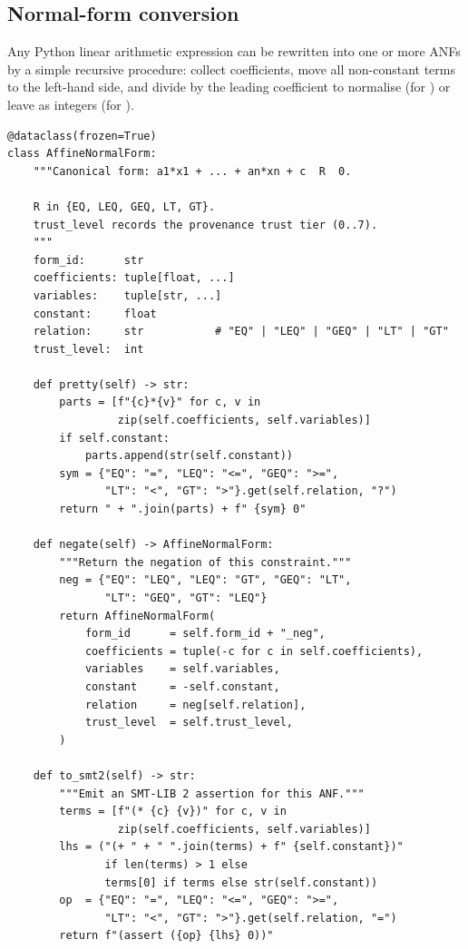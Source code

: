 \documentclass[11pt]{article}
\begin{document}
\subsection{Normal-form conversion}

Any Python linear arithmetic expression can be rewritten into
one or more ANFs by a simple recursive procedure:
collect coefficients, move all non-constant terms to the
left-hand side, and divide by the leading coefficient to
normalise (for \QFLRA{}) or leave as integers (for \QFLIA{}).

\begin{lstlisting}[style=jugeo-python,
  caption={\texttt{AffineNormalForm} dataclass from
  \texttt{tensor\_quantifier\_encodings/}\newline
  \texttt{affine\_and\_quasi\_affine\_normal\_for.py}.},
  label={lst:anf}]
@dataclass(frozen=True)
class AffineNormalForm:
    """Canonical form: a1*x1 + ... + an*xn + c  R  0.

    R in {EQ, LEQ, GEQ, LT, GT}.
    trust_level records the provenance trust tier (0..7).
    """
    form_id:      str
    coefficients: tuple[float, ...]
    variables:    tuple[str, ...]
    constant:     float
    relation:     str           # "EQ" | "LEQ" | "GEQ" | "LT" | "GT"
    trust_level:  int

    def pretty(self) -> str:
        parts = [f"{c}*{v}" for c, v in
                 zip(self.coefficients, self.variables)]
        if self.constant:
            parts.append(str(self.constant))
        sym = {"EQ": "=", "LEQ": "<=", "GEQ": ">=",
               "LT": "<", "GT": ">"}.get(self.relation, "?")
        return " + ".join(parts) + f" {sym} 0"

    def negate(self) -> AffineNormalForm:
        """Return the negation of this constraint."""
        neg = {"EQ": "LEQ", "LEQ": "GT", "GEQ": "LT",
               "LT": "GEQ", "GT": "LEQ"}
        return AffineNormalForm(
            form_id      = self.form_id + "_neg",
            coefficients = tuple(-c for c in self.coefficients),
            variables    = self.variables,
            constant     = -self.constant,
            relation     = neg[self.relation],
            trust_level  = self.trust_level,
        )

    def to_smt2(self) -> str:
        """Emit an SMT-LIB 2 assertion for this ANF."""
        terms = [f"(* {c} {v})" for c, v in
                 zip(self.coefficients, self.variables)]
        lhs = ("(+ " + " ".join(terms) + f" {self.constant})"
               if len(terms) > 1 else
               terms[0] if terms else str(self.constant))
        op  = {"EQ": "=", "LEQ": "<=", "GEQ": ">=",
               "LT": "<", "GT": ">"}.get(self.relation, "=")
        return f"(assert ({op} {lhs} 0))"
\end{lstlisting}
\end{document}
